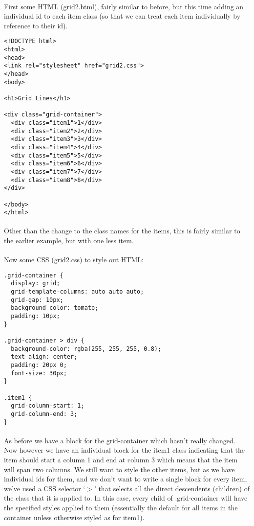 \documentclass[10pt, a4paper]{article}
\begin{document}
\paragraph{} First some HTML (grid2.html), fairly similar to before, but this time adding an individual id to each item class (so that we can treat each item individually by reference to their id).
\begin{lstlisting}
<!DOCTYPE html>
<html>
<head>
<link rel="stylesheet" href="grid2.css">
</head>
<body>

<h1>Grid Lines</h1>

<div class="grid-container">
  <div class="item1">1</div>
  <div class="item2">2</div>
  <div class="item3">3</div>  
  <div class="item4">4</div>
  <div class="item5">5</div>
  <div class="item6">6</div>
  <div class="item7">7</div>
  <div class="item8">8</div>  
</div>

</body>
</html>
\end{lstlisting}
\paragraph{} Other than the change to the class names for the items, this is fairly similar to the earlier example, but with one less item.

\paragraph{} Now some CSS (grid2.css) to style out HTML:
\begin{lstlisting}
.grid-container {
  display: grid;
  grid-template-columns: auto auto auto;
  grid-gap: 10px;
  background-color: tomato;
  padding: 10px;
}

.grid-container > div {
  background-color: rgba(255, 255, 255, 0.8);
  text-align: center;
  padding: 20px 0;
  font-size: 30px;
}

.item1 {
  grid-column-start: 1;
  grid-column-end: 3;
}
\end{lstlisting}
\paragraph{} As before we have a block for the grid-container which hasn't really changed. Now however we have an individual block for the item1 class indicating that the item should start a column 1 and end at column 3 which means that the item will span two columns. We still want to style the other items, but as we have individual ids for them, and we don't want to write a single block for every item, we've used a CSS selector `$>$' that selects all the direct descendents (children) of the class that it is applied to. In this case, every child of .grid-container will have the specified styles applied to them (essentially the default for all items in the container unless otherwise styled as for item1).
\end{document}

